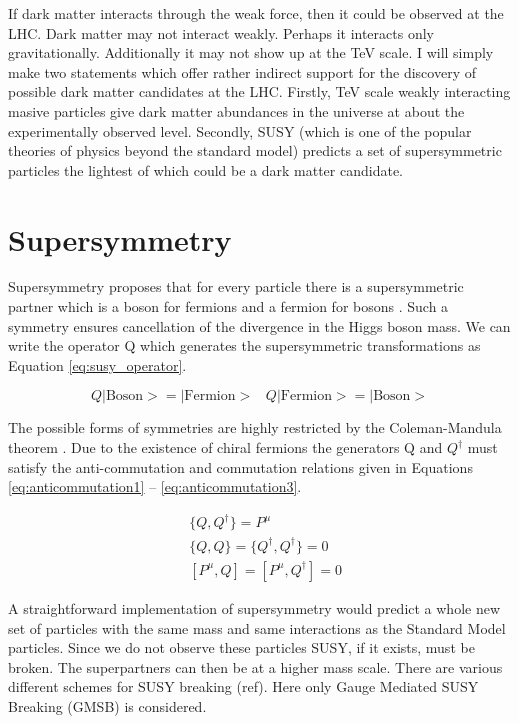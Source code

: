 If dark matter interacts through the weak force, then it could be observed at
the LHC. Dark matter may not interact weakly. Perhaps it interacts only 
gravitationally. Additionally it may not show up at the TeV scale. I will simply
make two statements which offer rather indirect support for the discovery of 
possible dark matter candidates at the LHC. Firstly, TeV scale weakly 
interacting masive particles give dark matter abundances in the universe at 
about the experimentally observed level. Secondly, SUSY (which is one of the 
popular theories of physics beyond the standard model) predicts a set of 
supersymmetric particles the lightest of which could be a dark matter candidate.

\section{Supersymmetry}

Supersymmetry proposes that for every particle there is a supersymmetric partner
which is a boson for fermions and a fermion for bosons \cite{primer}. Such a 
symmetry ensures cancellation of the divergence in the Higgs boson mass. We can 
write the operator Q which generates the supersymmetric transformations as 
Equation \ref{eq:susy_operator}.

\begin{equation}
Q|\mbox{Boson}> = |\mbox{Fermion}> \hspace{10pt} Q|\mbox{Fermion}> = |\mbox{Boson}>
\label{eq:susy_operator}
\end{equation}

The possible forms of symmetries are highly restricted by the Coleman-Mandula 
theorem \cite{coleman}. Due to the existence of chiral fermions the generators Q
and $Q^{\dagger}$ must satisfy the anti-commutation and commutation relations 
given in Equations \ref{eq:anticommutation1} -- \ref{eq:anticommutation3}.

\begin{eqnarray}
&\{Q,Q^{\dagger}\} = P^{\mu}
\label{eq:anticommutation1} \\
&\{Q,Q\} = \{Q^{\dagger},Q^{\dagger}\} = 0
\label{eq:anticommutation2} \\
&[P^{\mu},Q] = [P^{\mu},Q^{\dagger}] = 0
\label{eq:anticommutation3}
\end{eqnarray}

A straightforward implementation of supersymmetry would predict a whole new set
of particles with the same mass and same interactions as the Standard Model
particles. Since we do not observe these particles SUSY, if it exists, must be 
broken. The superpartners can then be at a higher mass scale. There are various
different schemes for SUSY breaking (ref). Here only Gauge Mediated SUSY 
Breaking (GMSB) is considered. \\

